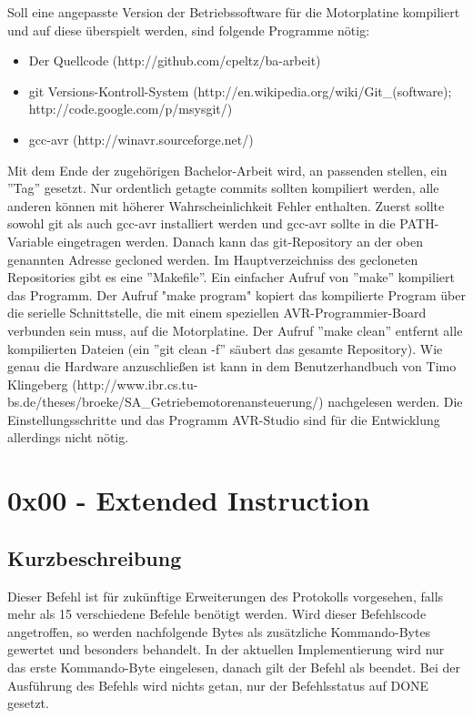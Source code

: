 \documentclass[a4paper]{article}
\begin{document}
	Soll eine angepasste Version der Betriebssoftware für die Motorplatine
	kompiliert und auf diese überspielt werden, sind folgende Programme nötig:
	\begin{itemize}
		\item Der Quellcode (http://github.com/cpeltz/ba-arbeit)
		\item git Versions-Kontroll-System (http://en.wikipedia.org/wiki/Git\_(software);
		http://code.google.com/p/msysgit/)
		\item gcc-avr (http://winavr.sourceforge.net/)
	\end{itemize}
	Mit dem Ende der zugehörigen Bachelor-Arbeit wird, an passenden stellen, ein ''Tag''
	gesetzt. Nur ordentlich getagte commits sollten kompiliert werden, alle anderen
	können mit höherer Wahrscheinlichkeit Fehler enthalten. Zuerst sollte sowohl
	git als auch gcc-avr installiert werden und gcc-avr sollte in die PATH-Variable
	eingetragen werden. Danach kann das git-Repository an der oben genannten Adresse
	gecloned werden. Im Hauptverzeichniss des gecloneten Repositories gibt es eine
	''Makefile''. Ein einfacher Aufruf von ''make'' kompiliert das Programm. Der Aufruf
	"make program" kopiert das kompilierte Program über die serielle Schnittstelle,
	die mit einem speziellen AVR-Programmier-Board verbunden sein muss, auf die
	Motorplatine. Der Aufruf ''make clean'' entfernt alle kompilierten Dateien (ein
	''git clean -f'' säubert das gesamte Repository). Wie genau die Hardware anzuschließen
	ist kann in dem Benutzerhandbuch von Timo Klingeberg (http://www.ibr.cs.tu-bs.de/theses/broeke/SA\_Getriebemotorenansteuerung/) nachgelesen werden. Die Einstellungsschritte und
	das Programm AVR-Studio sind für die Entwicklung allerdings nicht nötig.

	\pagebreak


	\section{0x00 - Extended Instruction}

	\subsection{Kurzbeschreibung}

	Dieser Befehl ist für zukünftige Erweiterungen des Protokolls vorgesehen,
	falls mehr als 15 verschiedene Befehle benötigt werden. Wird dieser
	Befehlscode angetroffen, so werden nachfolgende Bytes als zusätzliche
	Kommando-Bytes gewertet und besonders behandelt. In der aktuellen
	Implementierung wird nur das erste Kommando-Byte eingelesen, danach gilt der
	Befehl als beendet. Bei der	Ausführung des Befehls wird nichts getan,
	nur der Befehlsstatus auf DONE gesetzt.
\end{document}
